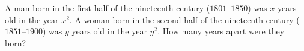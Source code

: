 A man born in the first half of the nineteenth century ($1801$--$1850$) was $x$ years old in the year $x^2$. A woman born in the second half of the nineteenth century ($1851$--$1900$) was $y$ years old in the year $y^2$. How many years apart were they born?
